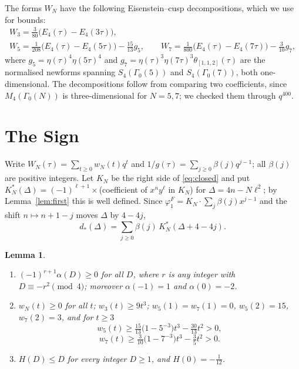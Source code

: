 \documentclass[mathematics,article,submit,pdftex,oneauthor]{Definitions/mdpi}
\numberwithin{equation}{section}
\theoremstyle{plain}
\newtheorem{lem}[thm]{Lemma}
\theoremstyle{remark}
\begin{document}
The forms $W_N$ have the following Eisenstein--cusp decompositions, which we use for bounds:
\begin{equation}\label{eq:decomp}
\begin{gathered}
W_3=\tfrac{3}{80}\bigl(E_4(\tau)-E_4(3\tau)\bigr),\\
W_5=\tfrac{1}{208}\bigl(E_4(\tau)-E_4(5\tau)\bigr)-\tfrac{15}{13}g_5,\qquad
W_7=\tfrac{1}{800}\bigl(E_4(\tau)-E_4(7\tau)\bigr)-\tfrac{3}{10}g_7,
\end{gathered}
\end{equation}
where $g_5=\eta(\tau)^4\eta(5\tau)^4$ and $g_7=\eta(\tau)^3\eta(7\tau)^3\theta_{[1,1,2]}(\tau)$ are the normalised newforms spanning $S_4(\Gamma_0(5))$ and $S_4(\Gamma_0(7))$, both one-dimensional. The decompositions follow from comparing two coefficients, since $M_4(\Gamma_0(N))$ is three-dimensional for $N=5,7$; we checked them through $q^{400}$.

\section{The Sign}\label{sec:sign}

Write $W_N(\tau)=\sum_{t\ge0}w_N(t)q^t$ and $1/g(\tau)=\sum_{j\ge0}\beta(j)q^{j-1}$; all $\beta(j)$ are positive integers. Let $K_N$ be the right side of \eqref{eq:closed} and put $K^*_N(\Delta)=(-1)^{\ell+1}\times$(coefficient of $x^ny^\ell$ in $K_N$) for $\Delta=4n-N\ell^2$; by Lemma~\ref{lem:first} this is well defined. Since $\varphi^F_1=K_N\cdot\sum_j\beta(j)x^{j-1}$ and the shift $n\mapsto n+1-j$ moves $\Delta$ by $4-4j$,
\begin{equation}\label{eq:dsum}
d_*(\Delta)=\sum_{j\ge0}\beta(j)\,K^*_N(\Delta+4-4j).
\end{equation}

\begin{lem}\label{lem:facts}
\begin{enumerate}
\item[(i)] $(-1)^{r+1}\alpha(D)\ge0$ for all $D$, where $r$ is any integer with $D\equiv -r^2\pmod 4$; moreover $\alpha(-1)=1$ and $\alpha(0)=-2$.
\item[(ii)] $w_N(t)\ge0$ for all $t$; $w_3(t)\ge9t^3$; $w_5(1)=w_7(1)=0$, $w_5(2)=15$, $w_7(2)=3$, and for $t\ge3$
\[
w_5(t)\ge\tfrac{15}{13}\bigl(1-5^{-3}\bigr)t^3-\tfrac{30}{13}t^2>0,\]\[ w_7(t)\ge\tfrac{3}{10}\bigl(1-7^{-3}\bigr)t^3-\tfrac35t^2>0.
\]
\item[(iii)] $H(D)\le D$ for every integer $D\ge1$, and $H(0)=-\tfrac1{12}$.
\end{enumerate}
\end{lem}
\end{document}
